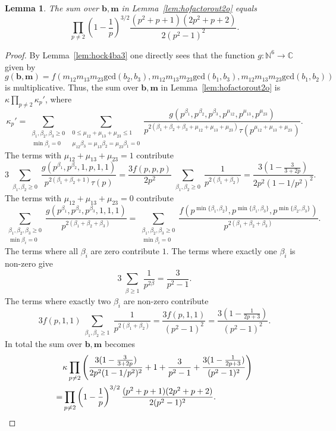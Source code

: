 \documentclass[a4paper,12pt,reqno]{amsart}
\numberwithin{equation}{section} \numberwithin{figure}{section}
\newcommand\N{\mathbb{N}}
\renewcommand{\l}{\left}
\renewcommand{\r}{\right}
\renewcommand{\b}{\mathbf}
\renewcommand{\gcd}{\textrm{gcd}}
\renewcommand{\leq}{\leqslant}
\renewcommand{\geq}{\geqslant}
\renewcommand{\#}{\sharp}
\newtheorem{lemma}{Lemma}
\theoremstyle{definition}
\numberwithin{lemma}{section}
\begin{document}
 \begin{lemma} 
\label{lem:eflatbwv852}
The sum over $\b b , \b m $ in Lemma~\ref{lem:hofactorout2o}
equals 
$$
\prod_{p\neq 2 } 
\l(1-\frac{1}{p} \r)^{3/2} 
\frac{(p^2+p+1)(2p^2+p+2)}{2(p^2-1)^2}
.$$
 \end{lemma}
\begin{proof}
By Lemma~\ref{lem:hock4ba3} 
one directly sees that  
  the function $g:\N^6\to \mathbb C$
given by 
$$ g( \b b, \b m )= f(   m_{12} m_{13} m_{23} \gcd(b_2,b_3),
 m_{12} m_{13} m_{23} \gcd(b_1,b_3),
m_{12} m_{13} m_{23} \gcd(b_1,b_2)
)$$ is multiplicative.
Thus, the sum over $\b b , \b m $ in Lemma~\ref{lem:hofactorout2o}
is  $\kappa \prod_{p\neq 2 } \kappa_p'$, where  
 \[\kappa_p'=
 \sum_{\substack{\beta_1,\beta_2,\beta_3 \geq 0  \\  \min \beta_i =0   }}
 \sum_{\substack{ 
 0\leq \mu_{12}+\mu_{13} +\mu_{23}\leq 1 
\\
\mu_{12} \beta_3  =
\mu_{13} \beta_2  = 
\mu_{23} \beta_1  = 0   }}
 \frac{  
g(p^{\beta_1}, p^{\beta_2}, p^{\beta_3}, p^{\mu_{12}},p^{\mu_{13}},p^{\mu_{23}} )
  }{     p^{2(\beta_1+\beta_2+\beta_3+\mu_{12}+\mu_{13} +\mu_{23})} 
\tau( p^{ \mu_{12}+\mu_{13} +\mu_{23} } )   }
. \]  
The terms with $\mu_{12}+\mu_{13} +\mu_{23}= 1 $ contribute    \[3 
 \sum_{\substack{\beta_1,\beta_2  \geq 0  }}
 \frac{  
g(p^{\beta_1}, p^{\beta_2}, 1, p ,1,1 )
 }{     p^{2(\beta_1+\beta_2 +1)} 
\tau( p )   }=
\frac{3 f(  p ,p,p  )   }{2p^2}  
 \sum_{\substack{\beta_1,\beta_2  \geq 0  }}  \frac{ 1 }{     p^{2(\beta_1+\beta_2  )}  }
 =\frac{3 (1-\frac{3}{3+2p} ) }{2p^2(1-1/p^2)^2}  
.\]
The terms with $\mu_{12}+\mu_{13} +\mu_{23}= 0 $ contribute  
\[
 \sum_{\substack{\beta_1,\beta_2,\beta_3 \geq 0  \\  \min \beta_i =0
   }}
 \frac{  
g(p^{\beta_1}, p^{\beta_2}, p^{\beta_3}, 1,1,1)
  }{     p^{2(\beta_1+\beta_2+\beta_3 )}   }
= \sum_{\substack{\beta_1,\beta_2,\beta_3 \geq 0  \\  \min \beta_i =0 }}
 \frac{  f(p^{\min\{\beta_1,\beta_2\}},
p^{\min\{\beta_1,\beta_3\}},
p^{\min\{\beta_2,\beta_3\}}  ) }{     p^{2(\beta_1+\beta_2+\beta_3 )}   }
 .\] 
 The terms  where all $\beta_i$ are zero contribute  $ 1$.
The terms  where exactly  one $\beta_i$ is non-zero give  
\[3   \sum_{\substack{\beta  \geq 1  }}
 \frac{  1}{     p^{2\beta}    }=\frac{3}{p^2-1}
.\]
The terms  where exactly two  $\beta_i$ are non-zero contribute   \[ 3f(p,1,1) 
 \sum_{\substack{\beta_1,\beta_2  \geq 1    }}
 \frac{  1 }{     p^{2(\beta_1+\beta_2  )}    }
=\frac{3f(p,1,1)  }{(p^2-1)^2}
=
\frac{3(1-\frac{1}{2p+3} )  }{(p^2-1)^2}
.\] In total the sum over $\b b, \b m $ becomes 
 \begin{align*}
&
\kappa\prod_{p\neq 2 }  \l(
\frac{3 (1-\frac{3}{3+2p} ) }{2p^2(1-1/p^2)^2}  
+1+\frac{3}{p^2-1}
+ \frac{3(1-\frac{1}{2p+3} )  }{(p^2-1)^2}
 \r) 
\\
=&
\prod_{p\neq 2 } 
\l(1-\frac{1}{p} \r)^{3/2} 
\frac{(p^2+p+1)(2p^2+p+2)}{2(p^2-1)^2}. \qedhere
\end{align*}
\end{proof} 
\end{document}
